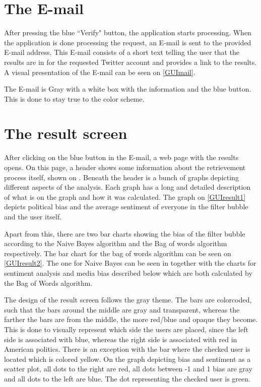 \section{The E-mail}
After pressing the blue ``Verify" button, the application starts processing.
When the application is done processing the request, an E-mail is sent to the provided E-mail address. This E-mail consists of a short text telling the user
that the results are in for the requested Twitter account and provides a link to
the results.
A visual presentation of the E-mail can be seen on \autoref{GUImail}.


The E-mail is Gray with a white box with the information and the blue button.
This is done to stay true to the color scheme. 

\section{The result screen}
After clicking on the blue button in the E-mail, a web page with the results
opens. On this page, a header shows some information about the retrievement
process itself, shown on . Beneath
the header is a bunch of graphs depicting different aspects of the analysis.
Each graph has a long and detailed description of what is on the graph and how
it was calculated. The graph on \autoref{GUIresult1} depicts political bias and
the average sentiment of everyone in the filter bubble and the user itself. 


Apart from this, there are two bar charts showing the bias of the
filter bubble according to the Naive Bayes algorithm and the Bag of words
algorithm respectively. The bar chart for the bag of words algorithm can be seen
on \autoref{GUIresult2}. The one for Naive Bayes can be seen in  together with the charts for sentiment analysis and media bias described
below which are both calculated by the Bag of Words algorithm.


The design of the result screen follows the gray theme. The bars are colorcoded,
such that the bars around the middle are gray and transparent, whereas the
farther the bars are from the middle, the more red/blue and opaque they become.
This is done to visually represent which side the users are placed, since the
left side is associated with blue, whereas the right side is associated with red
in American politics. There is an exception with the bar where the checked user
is located which is colored yellow. On the graph depicting bias and sentiment as
a scatter plot, all dots to the right are red, all dots between -1 and 1 bias are
gray and all dots to the left are blue. The dot representing the checked user is
green.


